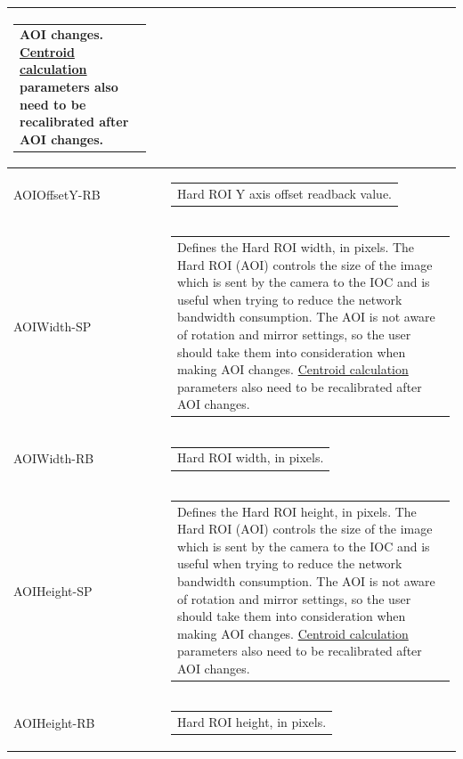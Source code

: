 \documentclass[openany]{article}
\begin{document}
\begin{longtable}{| m{3.0cm} m{4.5cm} m{7.0cm} |}
\begin{tabular}{@{}m{6cm}@{}}
                AOI changes. \hyperref[sec:centroid-calc]{Centroid calculation} parameters
                also need to be recalibrated after AOI changes.
            \end{tabular} \\ \hline
        AOIOffsetY-RB &  & \begin{tabular}{@{}m{6cm}@{}}
                Hard ROI Y axis offset readback value.
            \end{tabular} \hypertarget{pv:hard-roi-width}{}\\ \hline
        AOIWidth-SP &  & \begin{tabular}{@{}m{6cm}@{}}
                Defines the Hard ROI width, in pixels. The Hard ROI (AOI) controls the size
                of the image which is sent by the camera to the IOC and is useful when
                trying to reduce the network bandwidth consumption. The AOI is not aware of
                rotation and mirror settings, so the user should take them into
                consideration when making AOI changes. \hyperref[sec:centroid-calc]{Centroid
                calculation} parameters also need to be recalibrated after AOI changes.
            \end{tabular} \\ \hline
        AOIWidth-RB &  & \begin{tabular}{@{}m{6cm}@{}}
                Hard ROI width, in pixels.
            \end{tabular} \hypertarget{pv:hard-roi-height}{}\\ \hline
        AOIHeight-SP &  & \begin{tabular}{@{}m{6cm}@{}}
                Defines the Hard ROI height, in pixels. The Hard ROI (AOI) controls the size
                of the image which is sent by the camera to the IOC and is useful when
                trying to reduce the network bandwidth consumption. The AOI is not aware of
                rotation and mirror settings, so the user should take them into
                consideration when making AOI changes. \hyperref[sec:centroid-calc]{Centroid
                calculation} parameters also need to be recalibrated after AOI changes.
            \end{tabular} \\ \hline
        AOIHeight-RB &  & \begin{tabular}{@{}m{6cm}@{}}
                Hard ROI height, in pixels.
            \end{tabular} \hypertarget{pv:hard-roi-auto-center-x}{}\\ \hline

\end{longtable}
\end{document}
